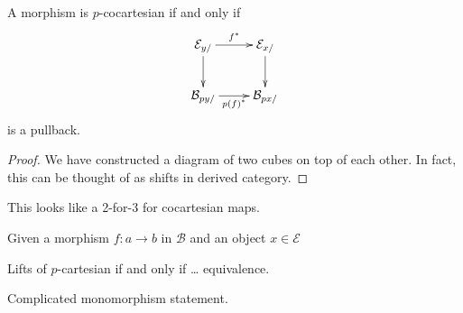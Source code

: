 \begin{exercise}
\label{exercise-3.6}
A morphism is $p$-cocartesian if and only if
$$
\xymatrix{
\mathcal{E}_{y/}\ar[r]^{f^*}\ar[d]&
\mathcal{E}_{x/}\ar[d]\\
\mathcal{B}_{py/}\ar[r]_{p(f)^*}&\mathcal{B}
_{px/}
}
$$
is a pullback.
\end{exercise}

\begin{proof}
We have constructed a diagram of two cubes on
top of each other.
In fact, this can be thought of as shifts in
derived category.
\end{proof}

\begin{lemma}
\label{lemma-3.5.3}
This looks like a 2-for-3 for cocartesian
maps.
\end{lemma}

\begin{definition}
\label{definition-cocartesian-lift}
Given a morphism $f:a \to b$ in $\mathcal{B}$
and an object $x \in \mathcal{E}$
\end{definition}

\begin{lemma}
\label{lemma-3.5.5.}
Lifts of $p$-cartesian if and only if …
equivalence.
\end{lemma}

\begin{lemma}
\label{lemma-3.5.6}
Complicated monomorphism statement.
\end{lemma}

